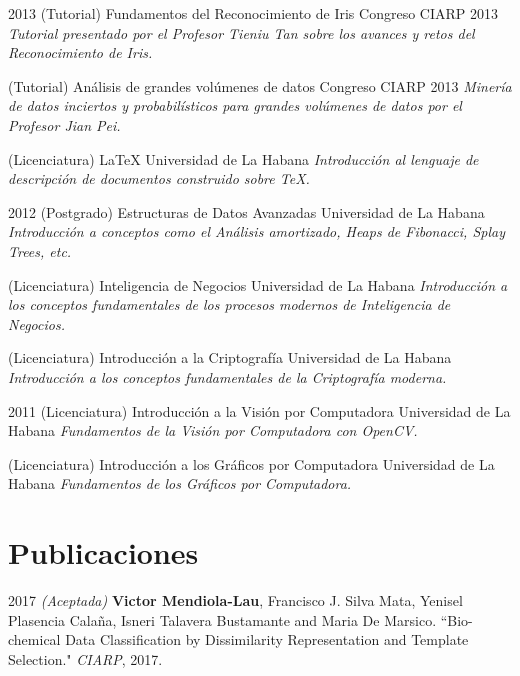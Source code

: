 \documentclass[]{friggeri-cv}
\begin{document}
\begin{entrylist}    
  \entry
    {2013}
    {(Tutorial) Fundamentos del Reconocimiento de Iris}
    {Congreso CIARP 2013}
    {\emph{Tutorial presentado por el Profesor Tieniu Tan sobre los avances y retos del Reconocimiento de Iris.}}

  \entry
    {}
    {(Tutorial) Análisis de grandes volúmenes de datos}
    {Congreso CIARP 2013}
    {\emph{Minería de datos inciertos y probabilísticos para grandes volúmenes de datos por el Profesor Jian Pei.}}
    
  \entry
    {}
    {(Licenciatura) \LaTeX}
    {Universidad de La Habana}
    {\emph{Introducción al lenguaje de descripción de documentos construido sobre \TeX.}}
\end{entrylist}
       
\begin{entrylist}
  \entry
    {2012}
    {(Postgrado) Estructuras de Datos Avanzadas}
    {Universidad de La Habana}
    {\emph{Introducción a conceptos como el Análisis amortizado, Heaps de Fibonacci, Splay Trees, etc.}}      

  \entry
    {}
    {(Licenciatura) Inteligencia de Negocios}
    {Universidad de La Habana}
    {\emph{Introducción a los conceptos fundamentales de los procesos modernos de Inteligencia de Negocios.}}

  \entry
    {}
    {(Licenciatura) Introducción a la Criptografía}
    {Universidad de La Habana}
    {\emph{Introducción a los conceptos fundamentales de la Criptografía moderna.}}
\end{entrylist}

\begin{entrylist}
  \entry
    {2011}
    {(Licenciatura) Introducción a la Visión por Computadora}
    {Universidad de La Habana}
    {\emph{Fundamentos de la Visión por Computadora con OpenCV.}}      

  \entry
    {}
    {(Licenciatura) Introducción a los Gráficos por Computadora}
    {Universidad de La Habana}
    {\emph{Fundamentos de los Gráficos por Computadora.}}
\end{entrylist}

\pagebreak

\section{Publicaciones}
\begin{paperlist}
  \paperentry
    {2017}
    {}
    {}
    {
		\emph{(Aceptada)} \textbf{Victor Mendiola-Lau}, Francisco J. Silva Mata, Yenisel Plasencia Calaña, Isneri Talavera Bustamante and Maria De Marsico. ``Bio-chemical Data Classification by Dissimilarity Representation and Template Selection." \emph{CIARP}, 2017.
    }
\end{paperlist}
\end{document}
